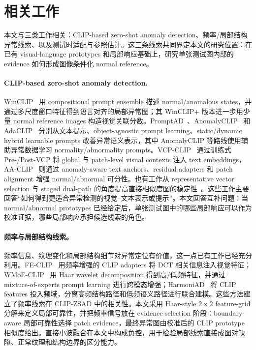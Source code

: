 \section{相关工作}

本文与三类工作相关：CLIP-based zero-shot anomaly detection、频率/局部结构异常线索、以及测试时适配与参照估计。这三条线索共同界定本文的研究位置：在已有 visual-language prototypes 和局部响应基础上，研究单张测试图内部的 evidence 如何形成图像条件化 normal reference。

\paragraph{CLIP-based zero-shot anomaly detection.}
WinCLIP~\cite{jeong2023winclip} 用 compositional prompt ensemble 描述 normal/anomalous states，并通过多尺度窗口特征得到语言对齐的局部异常图；其 WinCLIP+ 版本进一步用少量 normal reference images 构造视觉关联分数。PromptAD~\cite{li2024promptad}、AnomalyCLIP~\cite{zhou2024anomalyclip} 和 AdaCLIP~\cite{cao2024adaclip} 分别从文本提示、object-agnostic prompt learning、static/dynamic hybrid learnable prompts 改善异常语义表示，其中 AnomalyCLIP 等路线使用辅助异常数据学习 normality/abnormality prompts。VCP-CLIP~\cite{qu2024vcpclip} 通过训练式 Pre-/Post-VCP 将 global 与 patch-level visual contexts 注入 text embeddings，AA-CLIP~\cite{ma2025aaclip} 则通过 anomaly-aware text anchors、residual adapters 和 patch alignment 增强 normal/abnormal 可分性。也有工作从 representative vector selection 与 staged dual-path 的角度提高直接相似度图的稳定性~\cite{chen2024clipad}。这些工作主要回答“如何得到更适合异常检测的视觉--文本表示或提示”。本文回答互补问题：当 normal/abnormal prototypes 已经给定后，单张测试图中的哪些局部响应可以作为校准证据，哪些局部响应承担候选线索的角色。

\paragraph{频率与局部结构线索。}
频率信息、纹理变化和局部结构细节对异常定位有价值，这一点已有工作已经充分利用。FE-CLIP~\cite{gong2025feclip} 用频率增强的 CLIP adapters 将 DCT 相关信息注入视觉特征；WMoE-CLIP~\cite{chen2026wmoeclip} 用 Haar wavelet decomposition 得到高/低频特征，并通过 mixture-of-experts prompt learning 进行跨模态增强；HarmoniAD~\cite{zhang2026harmoniad} 将 CLIP features 投入频域，分离高频结构路径和低频语义路径进行联合建模。这些方法建立了频率线索在 CLIP-ZSAD 中的相关性。本文采用 Haar-style $2\times2$ feature-grid 分解来定义局部可靠性，并把频率信号放在 evidence selection 阶段：boundary-aware 局部可靠性选择 patch evidence，最终异常图由校准后的 CLIP prototype 相似度给出。直接小波融合在本文中构成负控，用于检验局部线索直接成图对缺陷、正常纹理和结构边界的区分能力。

